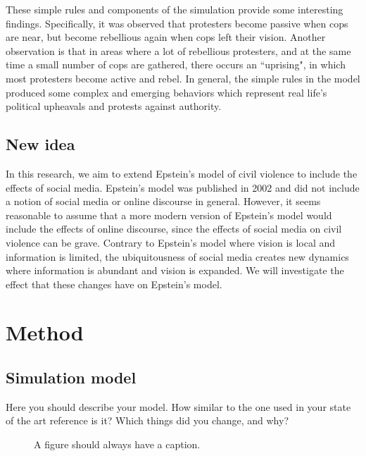 \documentclass[a4paper,11pt]{article}
\begin{document}
These simple rules and components of the simulation provide some interesting findings. Specifically, it was observed that protesters become passive when cops are near, but become rebellious again when cops left their vision. Another observation is that in areas where a lot of rebellious protesters, and at the same time a small number of cops are gathered, there occurs an “uprising", in which most protesters become active and rebel. In general, the simple rules in the model produced some complex and emerging behaviors which represent real life’s political upheavals and protests against authority.


\subsection{New idea}

In this research, we aim to extend Epstein's model of civil violence to include the effects of social media. Epstein's model was published in 2002 and did not include a notion of social media or online discourse in general. However, it seems reasonable to assume that a more modern version of Epstein's model would include the effects of online discourse, since the effects of social media on civil violence can be grave. Contrary to Epstein's model where vision is local and information is limited, the ubiquitousness of social media creates new dynamics where information is abundant and vision is expanded. We will investigate the effect that these changes have on Epstein's model. 

\section{Method}

\subsection{Simulation model}

Here you should describe your model.
How similar to the one used in your state of the art reference is it?
Which things did you change, and why?

\begin{figure}[h]
  \centering
  \caption{A figure should always have a caption.}\label{fig1:twoDots}
\end{figure}
\end{document}
